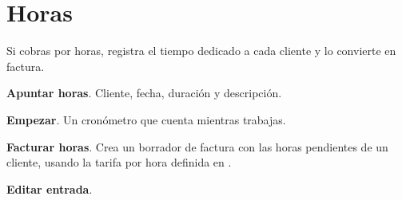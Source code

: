 \section{Horas}
Si cobras por horas,  registra el tiempo dedicado a cada cliente y lo convierte en factura.
\begin{leyenda}
\item[\mk{1}] \textbf{Apuntar horas}. Cliente, fecha, duración y descripción.
\item[\mk{2}] \textbf{Empezar}. Un cronómetro que cuenta mientras trabajas.
\item[\mk{3}] \textbf{Facturar horas}. Crea un borrador de factura con las horas pendientes de un cliente, usando la tarifa por hora definida en .
\item[\mk{4}] \textbf{Editar entrada}.
\end{leyenda}
